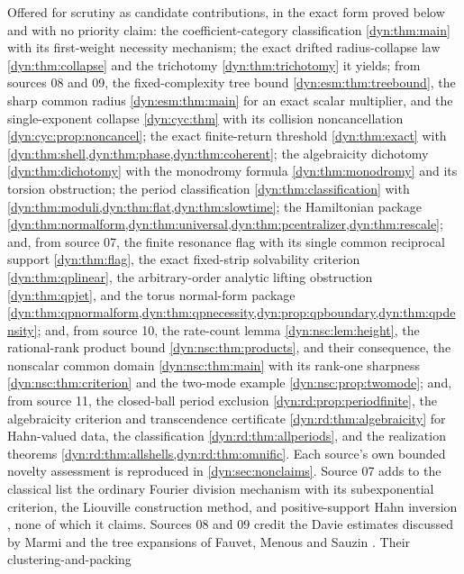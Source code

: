 \documentclass[11pt,letterpaper]{article}
\theoremstyle{definition}
\theoremstyle{remark}
\numberwithin{equation}{section}
\begin{document}
Offered for scrutiny as candidate contributions, in the exact form proved
below and with no priority claim: the coefficient-category classification
\cref{dyn:thm:main} with its first-weight necessity mechanism; the exact
drifted radius-collapse law \cref{dyn:thm:collapse} and the trichotomy
\cref{dyn:thm:trichotomy} it yields; from sources 08 and 09, the
fixed-complexity tree bound \cref{dyn:esm:thm:treebound}, the sharp common
radius \cref{dyn:esm:thm:main} for an exact scalar multiplier, and the
single-exponent collapse \cref{dyn:cyc:thm} with its collision
noncancellation \cref{dyn:cyc:prop:noncancel}; the exact finite-return threshold
\cref{dyn:thm:exact} with \cref{dyn:thm:shell,dyn:thm:phase,dyn:thm:coherent};
the algebraicity dichotomy \cref{dyn:thm:dichotomy} with the monodromy
formula \cref{dyn:thm:monodromy} and its torsion obstruction; the period
classification \cref{dyn:thm:classification} with
\cref{dyn:thm:moduli,dyn:thm:flat,dyn:thm:slowtime}; the Hamiltonian
package \cref{dyn:thm:normalform,dyn:thm:universal,dyn:thm:pcentralizer,dyn:thm:rescale};
and, from source 07, the finite resonance flag with its single common
reciprocal support \cref{dyn:thm:flag}, the exact fixed-strip solvability
criterion \cref{dyn:thm:qplinear}, the arbitrary-order analytic lifting
obstruction \cref{dyn:thm:qpjet}, and the torus normal-form package
\cref{dyn:thm:qpnormalform,dyn:thm:qpnecessity,dyn:prop:qpboundary,dyn:thm:qpdensity};
and, from source 10, the rate-count lemma \cref{dyn:nsc:lem:height}, the
rational-rank product bound \cref{dyn:nsc:thm:products}, and their
consequence, the nonscalar common domain \cref{dyn:nsc:thm:main} with its
rank-one sharpness \cref{dyn:nsc:thm:criterion} and the two-mode example
\cref{dyn:nsc:prop:twomode}; and, from source 11, the closed-ball period
exclusion \cref{dyn:rd:prop:periodfinite}, the algebraicity criterion and
transcendence certificate \cref{dyn:rd:thm:algebraicity} for Hahn-valued
data, the classification \cref{dyn:rd:thm:allperiods}, and the realization
theorems \cref{dyn:rd:thm:allshells,dyn:rd:thm:omnific}.
Each source's own bounded novelty assessment is reproduced in
\cref{dyn:sec:nonclaims}. Source 07 adds to the classical list the ordinary
Fourier division mechanism with its subexponential criterion, the Liouville
construction method, and positive-support Hahn inversion
\cite{Bounemoura,Kamienski,Neumann,Poonen}, none of which it claims.
Sources 08 and 09 credit the Davie estimates discussed by Marmi and the tree
expansions of Fauvet, Menous and Sauzin
\cite{Marmi,FauvetMenousSauzin,FMS26}. Their clustering-and-packing
\end{document}
